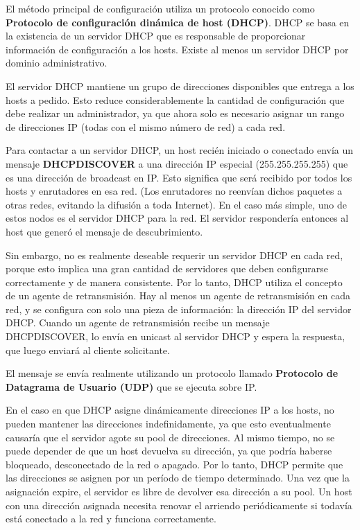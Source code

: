 El método principal de configuración utiliza un protocolo conocido como \textbf{Protocolo de configuración dinámica de host (DHCP)}. DHCP se basa en la existencia de un servidor DHCP que es responsable de proporcionar información de configuración a los hosts. Existe al menos un servidor DHCP por dominio administrativo.

El servidor DHCP mantiene un grupo de direcciones disponibles que entrega a los hosts a pedido. Esto reduce considerablemente la cantidad de configuración que debe realizar un administrador, ya que ahora solo es necesario asignar un rango de direcciones IP (todas con el mismo número de red) a cada red.

Para contactar a un servidor DHCP, un host recién iniciado o conectado envía un mensaje \textbf{DHCPDISCOVER} a una dirección IP especial (255.255.255.255) que es una dirección de broadcast en IP. Esto significa que será recibido por todos los hosts y enrutadores en esa red. (Los enrutadores no reenvían dichos paquetes a otras redes, evitando la difusión a toda Internet). En el caso más simple, uno de estos nodos es el servidor DHCP para la red. El servidor respondería entonces al host que generó el mensaje de descubrimiento.

Sin embargo, no es realmente deseable requerir un servidor DHCP en cada red, porque esto implica una gran cantidad de servidores que deben configurarse correctamente y de manera consistente. Por lo tanto, DHCP utiliza el concepto de un agente de retransmisión. Hay al menos un agente de retransmisión en cada red, y se configura con solo una pieza de información: la dirección IP del servidor DHCP. Cuando un agente de retransmisión recibe un mensaje DHCPDISCOVER, lo envía en unicast al servidor DHCP y espera la respuesta, que luego enviará al cliente solicitante.

El mensaje se envía realmente utilizando un protocolo llamado \textbf{Protocolo de Datagrama de Usuario (UDP)} que se ejecuta sobre IP.

En el caso en que DHCP asigne dinámicamente direcciones IP a los hosts, no pueden mantener las direcciones indefinidamente, ya que esto eventualmente causaría que el servidor agote su pool de direcciones. Al mismo tiempo, no se puede depender de que un host devuelva su dirección, ya que podría haberse bloqueado, desconectado de la red o apagado. Por lo tanto, DHCP permite que las direcciones se asignen por un período de tiempo determinado. Una vez que la asignación expire, el servidor es libre de devolver esa dirección a su pool. Un host con una dirección asignada necesita renovar el arriendo periódicamente si todavía está conectado a la red y funciona correctamente.

